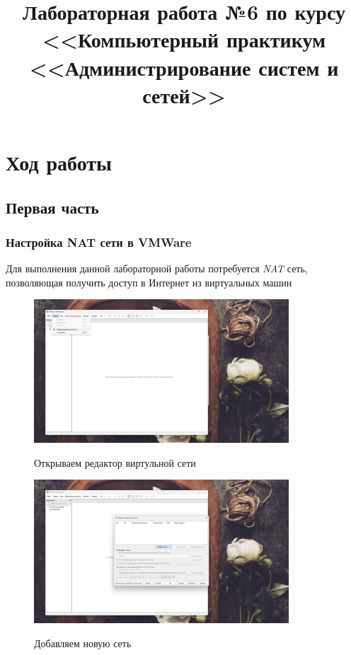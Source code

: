 \documentclass[a4paper]{article}
\title{
  Лабораторная работа №6 по курсу \\
  <<Компьютерный практикум <<Администрирование систем и сетей>>  
}
\begin{document}
  \templatedtitlepage
  
  \toc
  \section{Ход работы}
  \subsection{Первая часть}
  \subsubsection{Настройка NAT сети в VMWare}
  Для выполнения данной лабораторной работы потребуется \textit{NAT} сеть, позволяющая
  получить доступ в Интернет из виртуальных машин

  \begin{figure}[H]
    \centering
    \includegraphics[width=0.85\textwidth]{06_00 (2)}
    \label{img:2}
    \caption{Открываем редактор виртульной сети}
  \end{figure}
  
  \begin{figure}[H]
    \centering
    \includegraphics[width=0.85\textwidth]{06_00 (3)}
    \label{img:3}
    \caption{Добавляем новую сеть}
  \end{figure}
  
\end{document}
